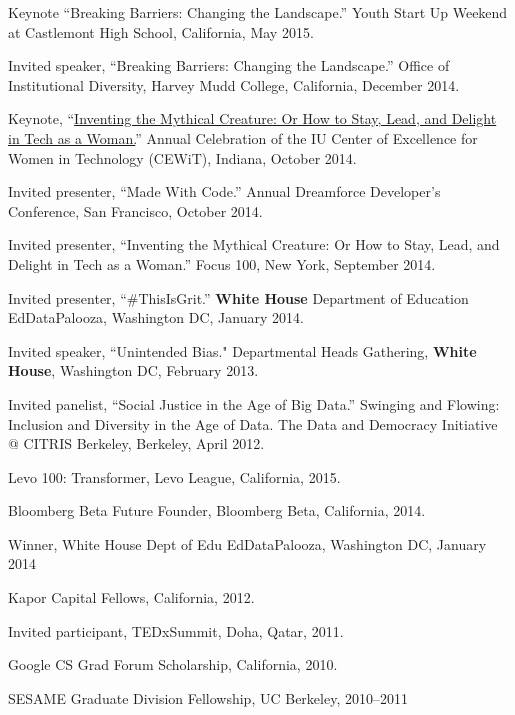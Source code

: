 \documentclass[11pt,article,oneside]{memoir}
\begin{document}
\ind Keynote ``Breaking Barriers: Changing the Landscape.'' Youth Start Up Weekend at Castlemont High School, California, May 2015. 

\ind Invited speaker, ``Breaking Barriers: Changing the Landscape.'' Office of Institutional Diversity, Harvey Mudd College, California, December 2014. 

\ind Keynote, ``\href{https://www.youtube.com/watch?v=owXez6sIRbY&ab_channel=IUCEWIT}{Inventing the Mythical Creature: Or How to Stay, Lead, and Delight in Tech as a Woman.}'' Annual Celebration of the IU Center of Excellence for Women in Technology (CEWiT), Indiana, October 2014.

\ind Invited presenter, ``Made With Code.'' Annual Dreamforce Developer's Conference, San Francisco, October 2014.

\ind Invited presenter, ``Inventing the Mythical Creature: Or How to Stay, Lead, and Delight in Tech as a Woman.'' Focus 100, New York, September 2014.

\ind Invited presenter, ``\#ThisIsGrit.'' \textbf{White House} Department of Education EdDataPalooza, Washington DC, January 2014.

\ind Invited speaker, ``Unintended Bias." Departmental Heads Gathering, \textbf{White House}, Washington DC, February 2013.

\ind Invited panelist, ``Social Justice in the Age of Big Data.'' Swinging and Flowing: Inclusion and Diversity in the Age of Data. The Data and Democracy Initiative @ CITRIS Berkeley, Berkeley, April 2012.

\bigskip 

\medskip

\ind Levo 100: Transformer, Levo League, California, 2015.

\ind Bloomberg Beta Future Founder, Bloomberg Beta, California, 2014. 

\ind Winner, White House Dept of Edu EdDataPalooza, Washington DC, January 2014

\ind Kapor Capital Fellows, California, 2012.

\ind Invited participant, TEDxSummit, Doha, Qatar, 2011.

\ind Google CS Grad Forum Scholarship, California, 2010.

\ind SESAME Graduate Division Fellowship, UC Berkeley, 2010--2011
\end{document}
